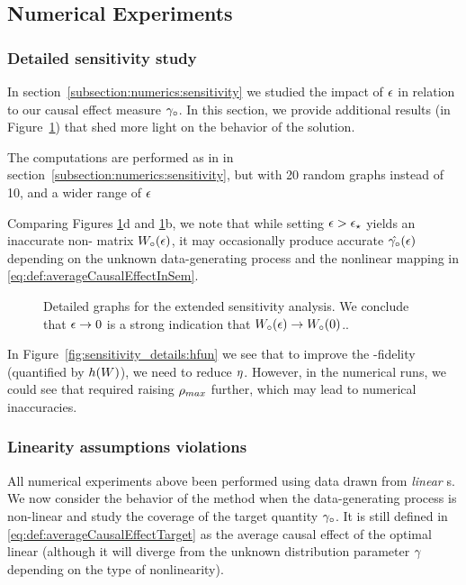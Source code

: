 \subsection{Numerical Experiments}
\subsubsection{Detailed sensitivity study}\label{subsection:extra_sensitivity}
In section~\ref{subsection:numerics:sensitivity} we studied the impact of $\epsilon$ in relation to our causal effect measure $\gamma_\circ$. In this section, we provide additional results (in Figure~\ref{fig:sensitivity_details}) that shed more light on the behavior of the solution. 

The computations are performed as in in section~\ref{subsection:numerics:sensitivity}, but with 20 random graphs instead of 10, and a wider range of $\epsilon$

Comparing Figures \ref{fig:sensitivity_details}d and \ref{fig:sensitivity_details}b, we note that while setting $\epsilon > \epsilon_\star$ yields an inaccurate non-\DAG{} matrix $W_\circ(\epsilon)$, it may occasionally produce accurate $\hat{\gamma_\circ}(\epsilon)$ depending on the unknown data-generating process and the nonlinear mapping in \eqref{eq:def:averageCausalEffectInSem}.

\begin{figure*}[ht!]
    \centering
    
    \caption{Detailed graphs for the extended sensitivity analysis. We conclude that $\epsilon \rightarrow 0$ is a strong indication that $W_\circ(\epsilon) \rightarrow W_\circ(0)$..}\label{fig:sensitivity_details}
\end{figure*}

In Figure~\ref{fig:sensitivity_details:hfun} we see that to improve the \DAG{}-fidelity (quantified by $h(W)$), we need to reduce $\eta$. However, in the numerical runs, we could see that required raising $\rho_{max}$ further, which may lead to numerical inaccuracies.



\subsubsection{Linearity assumptions violations}
\label{subsection:linearity_assumption_violation}

All numerical experiments above been performed using data drawn from \emph{linear} \scm{}s. We now consider the behavior of the method when the data-generating process is non-linear and study the coverage of the target quantity $\gamma_\circ$. It is still defined in \eqref{eq:def:averageCausalEffectTarget} as the average causal effect of the optimal linear \scm{} (although it will diverge from the unknown distribution parameter $\gamma$ depending on the type of nonlinearity). 

